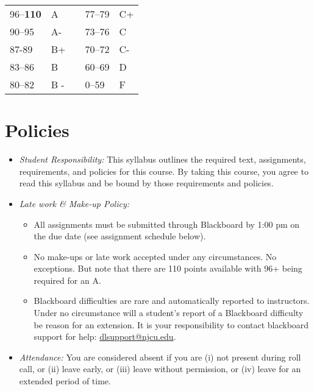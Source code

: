 \documentclass[11pt,article,oneside]{memoir}
\begin{document}
\begin{itemize}
{\begin{itemize}
 \begin{tabular}{ | l | l | p{2cm} | l | l | }
    \hline 
96--\textbf{110} & A  & &  77--79 &  C+ \\  
90--95 & A- & &  73--76 & C \\
87-89 & B+ &  &  70--72 & C- \\ 
83--86 & B  & &  60--69 & D\\
80--82 & B - & & 0--59 & F\\ \hline
    \end{tabular}


\end{itemize}




\section{Policies}

\begin{itemize}

\item \textit{Student Responsibility:} This syllabus outlines the required text, assignments, requirements, and policies for this course. By taking this course, you agree to read this syllabus and be bound by those requirements and policies. 

\item \textit{Late work \& Make-up Policy:} 
\begin{itemize}
\item All assignments must be submitted through Blackboard by 1:00 pm on the due date (see assignment schedule below).
\item  No make-ups or late work accepted under any circumstances. No exceptions. But note that there are 110 points available with 96+ being required for an A.
\item Blackboard difficulties are rare and automatically reported to instructors. Under no circumstance will a student's report of a Blackboard difficulty be reason for an extension. It is your responsibility to contact blackboard support for help: \href{dlsupport@njcu.edu}{dlsupport@njcu.edu}. 

\end{itemize}

\item \textit{Attendance:} You are considered absent if you are (i) not present during roll call, or (ii) leave early, or (iii) leave without permission, or (iv) leave for an extended period of time.


\end{itemize}}
\end{itemize}
\end{document}
